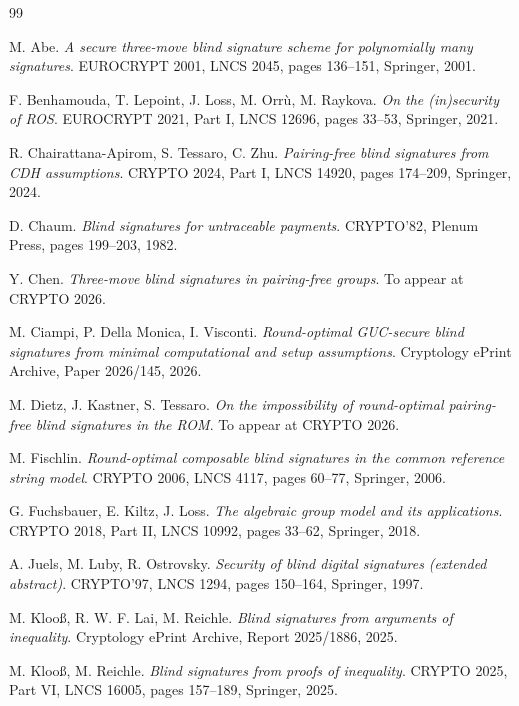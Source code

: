 \documentclass{aicr-conjecture}
\begin{document}
\begin{aicrbibliography}{99}

M. Abe.
\emph{A secure three-move blind signature scheme for polynomially many
signatures}.
EUROCRYPT 2001, LNCS 2045, pages 136--151, Springer, 2001.

F. Benhamouda, T. Lepoint, J. Loss, M. Orr\`u, M. Raykova.
\emph{On the (in)security of ROS}.
EUROCRYPT 2021, Part I, LNCS 12696, pages 33--53, Springer, 2021.

R. Chairattana-Apirom, S. Tessaro, C. Zhu.
\emph{Pairing-free blind signatures from CDH assumptions}.
CRYPTO 2024, Part I, LNCS 14920, pages 174--209, Springer, 2024.

D. Chaum.
\emph{Blind signatures for untraceable payments}.
CRYPTO'82, Plenum Press, pages 199--203, 1982.

Y. Chen.
\emph{Three-move blind signatures in pairing-free groups}.
To appear at CRYPTO 2026.

M. Ciampi, P. Della Monica, I. Visconti.
\emph{Round-optimal GUC-secure blind signatures from minimal computational
and setup assumptions}.
Cryptology ePrint Archive, Paper 2026/145, 2026.

M. Dietz, J. Kastner, S. Tessaro.
\emph{On the impossibility of round-optimal pairing-free blind signatures
in the ROM}.
To appear at CRYPTO 2026.

M. Fischlin.
\emph{Round-optimal composable blind signatures in the common reference
string model}.
CRYPTO 2006, LNCS 4117, pages 60--77, Springer, 2006.

G. Fuchsbauer, E. Kiltz, J. Loss.
\emph{The algebraic group model and its applications}.
CRYPTO 2018, Part II, LNCS 10992, pages 33--62, Springer, 2018.

A. Juels, M. Luby, R. Ostrovsky.
\emph{Security of blind digital signatures (extended abstract)}.
CRYPTO'97, LNCS 1294, pages 150--164, Springer, 1997.

M. Kloo\ss{}, R. W. F. Lai, M. Reichle.
\emph{Blind signatures from arguments of inequality}.
Cryptology ePrint Archive, Report 2025/1886, 2025.

M. Kloo\ss{}, M. Reichle.
\emph{Blind signatures from proofs of inequality}.
CRYPTO 2025, Part VI, LNCS 16005, pages 157--189, Springer, 2025.


\end{aicrbibliography}
\end{document}
